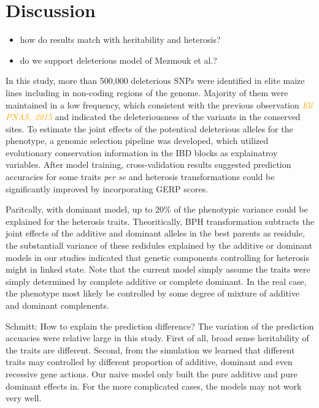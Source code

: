 \documentclass[9pt,twocolumn,twoside]{gsajnl}
\newcommand{\yang}[1]{\textcolor{orange}{\emph{\scriptsize  #1}} }
\begin{document}
\section*{Discussion}

\begin{itemize}
  \item how do results match with heritability and heterosis?
  \item do we support deleterious model of Mezmouk et al.?
\end{itemize}


In this study, more than 500,000 deleterious SNPs were identified in elite maize lines including in non-coding regions of the genome. Majority of them were maintained in a low frequency, which consistent with the previous observation \yang{Eli PNAS, 2015} and indicated the deleteriousness of the variants in the conserved sites. To estimate the joint effects of the potentical deleterious alleles for the phenotype, a genomic selection pipeline was developed, which utilized evolutionary conservation information in the IBD blocks as explainatroy variables. After model training, cross-validation results suggested prediction accuracies for some traits \emph{per se} and heterosis transformations could be significantly improved by incorporating GERP scores. 

Paritcally, with dominant model, up to 20\% of the phenotypic variance could be explained for the heterosis traits. Theoritically, BPH transformation subtracts the joint effects of the additive and dominant alleles in the best parents as residule, the substantiall variance of these redidules explained by the additive or dominant models in our studies indicated that genetic components controlling for heterosis might in linked state. Note that the current model simply assume the traits were simply determined by complete additive or complete dominant. In the real case, the phenotype most likely be controlled by some degree of mixture of additive and dominant complenents. 

Schmitt: How to explain the prediction difference?  
The variation of the prediction accuacies were relative large in this study. First of all, broad sense heritability of the traits are different. Second, from the simulation we learned that different traits may controlled by different proportion of additive, dominant and even recessive gene actions. Our naive model only built the pure additive and pure dominant effects in. For the more complicated cases, the models may not work very well.
\end{document}
